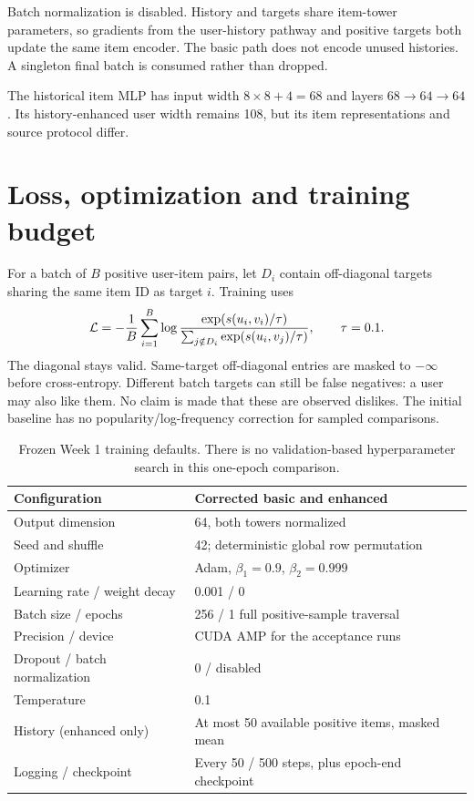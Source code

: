 \documentclass[11pt,a4paper]{article}
\begin{document}
Batch normalization is disabled. History and targets share item-tower parameters, so gradients from the user-history pathway and positive targets both update the same item encoder. The basic path does not encode unused histories. A singleton final batch is consumed rather than dropped.

The historical item MLP has input width $8\times8+4=68$ and layers $68\rightarrow64\rightarrow64$. Its history-enhanced user width remains 108, but its item representations and source protocol differ.
\clearpage
\section{Loss, optimization and training budget}
For a batch of $B$ positive user-item pairs, let $D_i$ contain off-diagonal targets sharing the same item ID as target $i$. Training uses
\[\mathcal L=-{1\over B}\sum_{i=1}^B\log
{\exp(s(u_i,v_i)/\tau)\over\sum_{j\notin D_i}\exp(s(u_i,v_j)/\tau)},\qquad\tau=0.1.\]
The diagonal stays valid. Same-target off-diagonal entries are masked to $-\infty$ before cross-entropy. Different batch targets can still be false negatives: a user may also like them. No claim is made that these are observed dislikes. The initial baseline has no popularity/log-frequency correction for sampled comparisons.

\begin{table}[H]\centering
\begin{tabular}{ll}\toprule Configuration & Corrected basic and enhanced\\\midrule
Output dimension & 64, both towers normalized\\
Seed and shuffle & 42; deterministic global row permutation\\
Optimizer & Adam, $\beta_1=0.9$, $\beta_2=0.999$\\
Learning rate / weight decay & 0.001 / 0\\
Batch size / epochs & 256 / 1 full positive-sample traversal\\
Precision / device & CUDA AMP for the acceptance runs\\
Dropout / batch normalization & 0 / disabled\\
Temperature & 0.1\\
History (enhanced only) & At most 50 available positive items, masked mean\\
Logging / checkpoint & Every 50 / 500 steps, plus epoch-end checkpoint\\\bottomrule
\end{tabular}\caption{Frozen Week 1 training defaults. There is no validation-based hyperparameter search in this one-epoch comparison.}\end{table}
\end{document}
